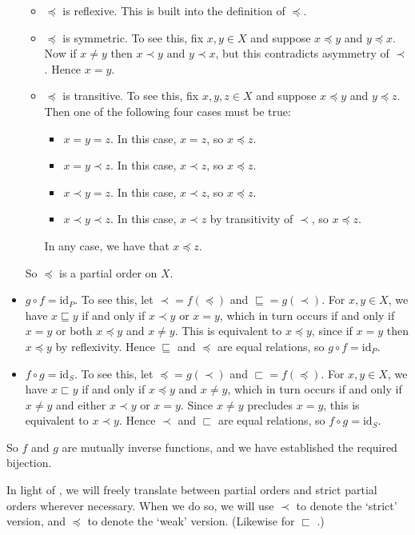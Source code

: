 \begin{cproof}
\begin{itemize}
\begin{itemize}
\item $\preceq$ is reflexive. This is built into the definition of $\preceq$.
\item $\preceq$ is symmetric. To see this, fix $x,y \in X$ and suppose $x \preceq y$ and $y \preceq x$. Now if $x \ne y$ then $x \prec y$ and $y \prec x$, but this contradicts asymmetry of $\prec$. Hence $x=y$.
\item $\preceq$ is transitive. To see this, fix $x,y,z \in X$ and suppose $x \preceq y$ and $y \preceq z$. Then one of the following four cases must be true:
\begin{itemize}
\item $x=y=z$. In this case, $x=z$, so $x \preceq z$.
\item $x=y\prec z$. In this case, $x \prec z$, so $x \preceq z$.
\item $x \prec y = z$. In this case, $x \prec z$, so $x \preceq z$.
\item $x \prec y \prec z$. In this case, $x \prec z$ by transitivity of $\prec$, so $x \preceq z$.
\end{itemize}
In any case, we have that $x \preceq z$.
\end{itemize}
So $\preceq$ is a partial order on $X$.
\item $g \circ f = \mathrm{id}_P$. To see this, let ${\prec} = f({\preceq})$ and ${\sqsubseteq} = g(\prec)$. For $x,y \in X$, we have $x \sqsubseteq y$ if and only if $x \prec y$ or $x = y$, which in turn occurs if and only if $x=y$ or both $x \preceq y$ and $x \ne y$. This is equivalent to $x \preceq y$, since if $x=y$ then $x \preceq y$ by reflexivity. Hence ${\sqsubseteq}$ and ${\preceq}$ are equal relations, so $g \circ f = \mathrm{id}_P$.
\item $f \circ g = \mathrm{id}_S$. To see this, let ${\preceq} = g({\prec})$ and ${\sqsubset} = f({\preceq})$. For $x,y \in X$, we have $x \sqsubset y$ if and only if $x \preceq y$ and $x \ne y$, which in turn occurs if and only if $x \ne y$ and either $x \prec y$ or $x = y$. Since $x \ne y$ precludes $x=y$, this is equivalent to $x \prec y$. Hence $\prec$ and $\sqsubset$ are equal relations, so $f \circ g = \mathrm{id}_S$.
\end{itemize}
So $f$ and $g$ are mutually inverse functions, and we have established the required bijection.
\end{cproof}

In light of , we will freely translate between partial orders and strict partial orders wherever necessary. When we do so, we will use $\prec$  to denote the `strict' version, and $\preceq$ to denote the `weak' version. (Likewise for $\sqsubset$ .)

